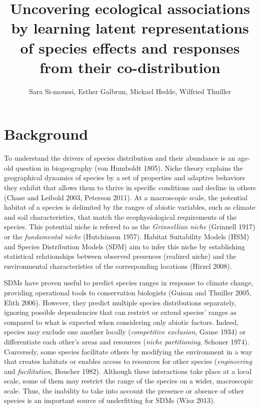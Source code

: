 \documentclass[10pt,a4paper]{article}
\title{Uncovering ecological associations by learning latent representations of species effects and responses from their co-distribution}
\author{Sara Si-moussi, Esther Galbrun, Mickael Hedde, Wilfried Thuiller}
\begin{document}
\maketitle

\section{Background}
To understand the drivers of species distribution and their abundance
is an age-old question in biogeography (von Humboldt 1805). Niche
theory explains the geographical dynamics of species by a set of
properties and adaptive behaviors they exhibit that allows them to
thrive in specific conditions and decline in others (Chase and Leibold
2003, Peterson 2011).  At a macroscopic scale, the potential habitat
of a species is delimited by the ranges of abiotic variables, such as
climate and soil characteristics, that match the ecophysiological
requirements of the species. This potential niche is refered to as the
\emph{Grinnellian niche} (Grinnell 1917) or the \emph{fundamental
  niche} (Hutchinson 1957).  Habitat Suitability Models (HSM) and
Species Distribution Models (SDM) aim to infer this niche by
establishing statistical relationships between observed presences
(realized niche) and the environmental characteristics of the
corresponding locations (Hirzel 2008).

SDMs have proven useful to predict species ranges in response to
climate change, providing operational tools to conservation biologists
(Guisan and Thuiller 2005, Elith 2006). However, they predict multiple
species distributions separately, ignoring possible dependencies that
can restrict or extend species' ranges as compared to what is expected
when considering only abiotic factors.  Indeed, species may exclude
one another locally (\emph{competitive exclusion}, Gause 1934) or
differentiate each other's areas and resources (\emph{niche
  partitioning}, Schoner 1974). Conversely, some species facilitate
others by modifying the environment in a way that creates habitats or
enables access to resources for other species (\emph{engineering} and
\emph{facilitation}, Boucher 1982).  Although these interactions take
place at a local scale, some of them may restrict the range of the
species on a wider, macroscopic scale.  Thus, the inability to take
into account the presence or absence of other species is an important
source of underfitting for SDMs (Wisz 2013).
\end{document}
